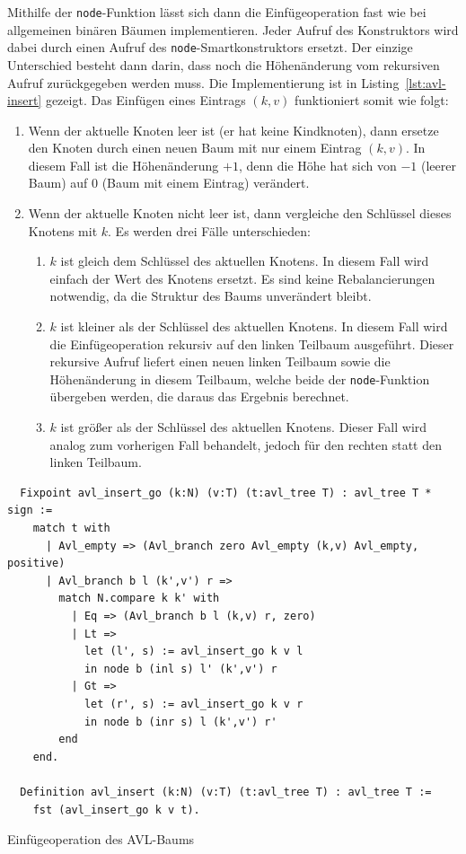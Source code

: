 \documentclass[a4paper, parskip]{scrartcl}
\begin{document}
Mithilfe der \verb|node|-Funktion lässt sich dann die Einfügeoperation fast wie bei allgemeinen binären Bäumen implementieren.
Jeder Aufruf des Konstruktors wird dabei durch einen Aufruf des \verb|node|-Smartkonstruktors ersetzt.
Der einzige Unterschied besteht dann darin, dass noch die Höhenänderung vom rekursiven Aufruf zurückgegeben werden muss.
Die Implementierung ist in Listing~\ref{lst:avl-insert} gezeigt.
Das Einfügen eines Eintrags $(k,v)$ funktioniert somit wie folgt:
\begin{enumerate}
\item 
  Wenn der aktuelle Knoten leer ist (er hat keine Kindknoten), dann ersetze den Knoten durch einen neuen Baum mit nur einem Eintrag $(k,v)$.
  In diesem Fall ist die Höhenänderung $+1$, denn die Höhe hat sich von $-1$ (leerer Baum) auf $0$ (Baum mit einem Eintrag) verändert.
\item
  Wenn der aktuelle Knoten nicht leer ist, dann vergleiche den Schlüssel dieses Knotens mit $k$. Es werden drei Fälle unterschieden:
  \begin{enumerate}
  \item $k$ ist gleich dem Schlüssel des aktuellen Knotens. In diesem Fall wird einfach der Wert des Knotens ersetzt. Es sind keine Rebalancierungen notwendig, da die Struktur des Baums unverändert bleibt.
  \item $k$ ist kleiner als der Schlüssel des aktuellen Knotens. In diesem Fall wird die Einfügeoperation rekursiv auf den linken Teilbaum ausgeführt. Dieser rekursive Aufruf liefert einen neuen linken Teilbaum sowie die Höhenänderung in diesem Teilbaum, welche beide der \verb|node|-Funktion übergeben werden, die daraus das Ergebnis berechnet.
  \item $k$ ist größer als der Schlüssel des aktuellen Knotens. Dieser Fall wird analog zum vorherigen Fall behandelt, jedoch für den rechten statt den linken Teilbaum.
  \end{enumerate}
\end{enumerate}

\begin{listing}
  \begin{verbatim}
  Fixpoint avl_insert_go (k:N) (v:T) (t:avl_tree T) : avl_tree T * sign :=
    match t with
      | Avl_empty => (Avl_branch zero Avl_empty (k,v) Avl_empty, positive)
      | Avl_branch b l (k',v') r =>
        match N.compare k k' with
          | Eq => (Avl_branch b l (k,v) r, zero)
          | Lt =>
            let (l', s) := avl_insert_go k v l
            in node b (inl s) l' (k',v') r
          | Gt =>
            let (r', s) := avl_insert_go k v r
            in node b (inr s) l (k',v') r'
        end
    end.

  Definition avl_insert (k:N) (v:T) (t:avl_tree T) : avl_tree T :=
    fst (avl_insert_go k v t).
  \end{verbatim}
  \caption{Einfügeoperation des AVL-Baums}
  \label{lst:avl-insert}
\end{listing}
\end{document}
